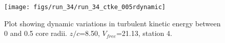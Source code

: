 \begin{figure}[H]
\centering
\texttt{[image: figs/run\_34/run\_34\_ctke\_005rdynamic]}
\caption{Plot showing dynamic variations in turbulent kinetic energy between 0 and 0.5 core radii. $z/c$=8.50, $V_{free}$=21.13, station 4.}
\label{fig:run_34_ctke_005rdynamic}
\end{figure}


